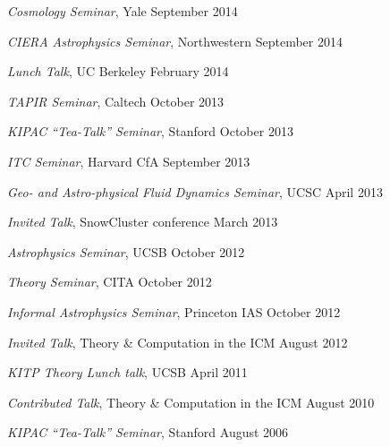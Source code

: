 \begin{talkenum}
\item \textit{Cosmology Seminar}, Yale \hspace*{\fill} September 2014

\item \textit{CIERA Astrophysics Seminar}, Northwestern \hspace*{\fill} September 2014

\item \textit{Lunch Talk}, UC Berkeley \hspace*{\fill} February 2014

\item \textit{TAPIR Seminar}, Caltech \hspace*{\fill} October 2013

\item \textit{KIPAC “Tea-Talk” Seminar}, Stanford \hspace*{\fill} October 2013

\item \textit{ITC Seminar}, Harvard CfA \hspace*{\fill} September 2013

\item \textit{Geo- and Astro-physical Fluid Dynamics Seminar}, UCSC \hspace*{\fill} April 2013

\item \textit{Invited Talk}, SnowCluster conference \hspace*{\fill} March 2013

\item \textit{Astrophysics Seminar}, UCSB \hspace*{\fill} October 2012

\item \textit{Theory Seminar}, CITA \hspace*{\fill} October 2012

\item \textit{Informal Astrophysics Seminar}, Princeton IAS \hspace*{\fill} October 2012

\item \textit{Invited Talk}, Theory \& Computation in the ICM \hspace*{\fill} August 2012

\item \textit{KITP Theory Lunch talk}, UCSB \hspace*{\fill} April 2011

\item \textit{Contributed Talk}, Theory \& Computation in the ICM \hspace*{\fill} August 2010

\item \textit{KIPAC “Tea-Talk” Seminar}, Stanford \hspace*{\fill} August 2006

\end{talkenum}
